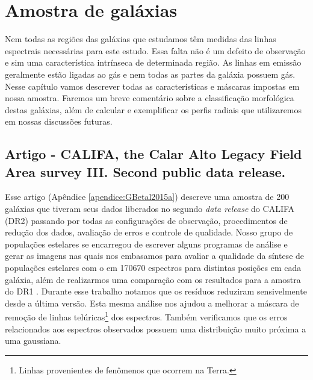 


\chapter{Amostra de galáxias}
\label{sec:amostra}

Nem todas as regiões das galáxias que estudamos têm medidas das linhas espectrais necessárias para
este estudo. Essa falta não é um defeito de observação e sim uma característica intrínseca de
determinada região. As linhas em emissão geralmente estão ligadas ao gás e nem todas as partes da
galáxia possuem gás. Nesse capítulo vamos descrever todas as características e máscaras impostas em
nossa amostra. Faremos um breve comentário sobre a classificação morfológica destas galáxias, além
de calcular e exemplificar os perfis radiais que utilizaremos em nossas discussões futuras.

\section{Artigo - CALIFA, the Calar Alto Legacy Field Area survey III. Second public data
release.}

Esse artigo (Apêndice \ref{apendice:GBetal2015a}) descreve uma amostra de 200 galáxias que tiveram
seus dados liberados no segundo {\em data release} do CALIFA (DR2) passando por todas as
configurações de observação, procedimentos de redução dos dados, avaliação de erros e controle de
qualidade. Nosso grupo de populações estelares se encarregou de escrever alguns programas de análise
e gerar as imagens nas quais nos embasamos para avaliar a qualidade da síntese de populações
estelares com o \starlight em 170670 espectros para distintas posições em cada galáxia, além de
realizarmos uma comparação com os resultados para a amostra do DR1 \citep{Husemann.etal.2013a}.
Durante esse trabalho notamos que os resíduos reduziram sensivelmente desde a última versão. Esta
mesma análise nos ajudou a melhorar a máscara de remoção de linhas telúricas\footnote{Linhas
provenientes de fenômenos que ocorrem na Terra.} dos espectros. Também verificamos que os erros
relacionados aos espectros observados possuem uma distribuição muito próxima a uma gaussiana.

